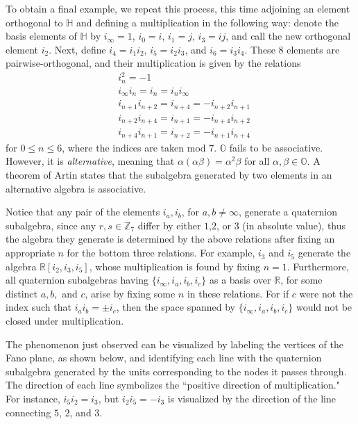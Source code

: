 \documentclass[10pt]{amsart}
\newcommand{\Z}{\mathbb{Z}}
\newcommand{\R}{\mathbb{R}}
\renewcommand{\H}{\mathbb{H}}
\renewcommand{\O}{\mathbb{O}}
\begin{document}
To obtain a final example, we repeat this process, this time adjoining an element orthogonal to $\H$ and defining a multiplication in the following way: denote the basis elements of $\H$ by $i_\infty = 1$, $i_0 = i$, $i_1 = j$, $i_3 = ij$, and call the new orthogonal element $i_2$.  Next, define $i_4 = i_1i_2$, $i_5 = i_2i_3$, and $i_6 = i_3i_4$.  These $8$ elements are pairwise-orthogonal, and their multiplication is given by the relations
\begin{align*}
&i_n^2 = -1 \\
&i_\infty i_n = i_n =  i_n i_\infty \\
&i_{n+1}i_{n+2} = i_{n+4} = - i_{n+2}i_{n+1} \\
&i_{n+2}i_{n+4} = i_{n+1} = - i_{n+4}i_{n+2} \\
&i_{n+4}i_{n+1} = i_{n+2} = - i_{n+1}i_{n+4}
\end{align*}
for $0 \leq n \leq 6$, where the indices are taken mod $7$.  $\O$ fails to be associative.  However, it is \emph{alternative}, meaning that $\alpha(\alpha\beta) = \alpha^2 \beta$ for all $\alpha,\beta \in \O$.  A theorem of Artin states that the subalgebra generated by two elements in an alternative algebra is associative.

Notice that any pair of the elements $i_a, i_b$, for $a,b \neq \infty$, generate a quaternion subalgebra, since any $r,s \in \Z_7$ differ by either $1$,$2$, or $3$ (in absolute value), thus the algebra they generate is determined by the above relations after fixing an appropriate $n$ for the bottom three relations.  For example, $i_3$ and $i_5$ generate the algebra $\R[i_2,i_3,i_5]$, whose multiplication is found by fixing $n = 1$.  Furthermore, all quaternion subalgebras having $\{i_\infty, i_a, i_b, i_c\}$ as a basis over $\R$, for some distinct $a,b,$ and $c$, arise by fixing some $n$ in these relations.  For if $c$ were not the index such that $i_a i_b = \pm i_c$, then the space spanned by $\{i_\infty, i_a, i_b, i_c\}$ would not be closed under multiplication.


The phenomenon just observed can be visualized by labeling the vertices of the Fano plane, as shown below, and identifying each line with the quaternion subalgebra generated by the units corresponding to the nodes it passes through.  The direction of each line symbolizes the ``positive direction of multiplication."  For instance, $i_5i_2 = i_3$, but $i_2i_5 = -i_3$ is visualized by the direction of the line connecting $5$, $2$, and $3$.
\end{document}
